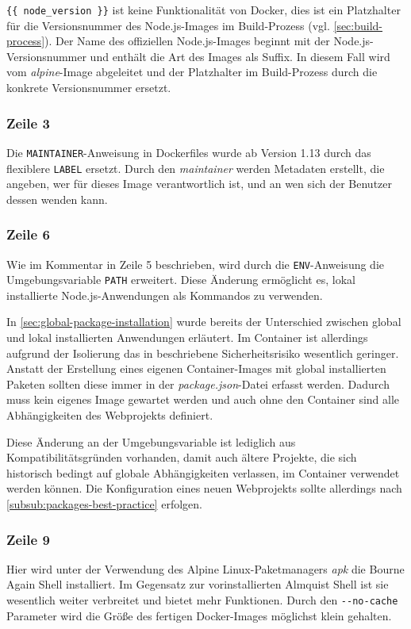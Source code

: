 \verb|{{ node_version }}| ist keine Funktionalität von Docker, dies ist ein Platzhalter für die Versionsnummer des Node.js-Images im Build-Prozess (vgl. \cref{sec:build-process}).
Der Name des offiziellen Node.js-Images beginnt mit der Node.js-Versionsnummer und enthält die Art des Images als Suffix.
In diesem Fall wird vom \emph{alpine}-Image abgeleitet und der Platzhalter im Build-Prozess durch die konkrete Versionsnummer ersetzt.

\subsubsection{Zeile 3}
Die \verb|MAINTAINER|-Anweisung in Dockerfiles wurde ab Version 1.13 durch das flexiblere \verb|LABEL| ersetzt.
Durch den \emph{maintainer} werden Metadaten erstellt, die angeben, wer für dieses Image verantwortlich ist, und an wen sich der Benutzer dessen wenden kann.

\subsubsection{Zeile 6}
Wie im Kommentar in Zeile 5 beschrieben, wird durch die \verb|ENV|-Anweisung die Umgebungsvariable \verb|PATH| erweitert.
Diese Änderung ermöglicht es, lokal installierte Node.js-Anwendungen als Kommandos zu verwenden.

In \cref{sec:global-package-installation} wurde bereits der Unterschied zwischen global und lokal installierten Anwendungen erläutert.
Im Container ist allerdings aufgrund der Isolierung das in \autocite{stackoverflow:nodemodules-hack:online} beschriebene Sicherheitsrisiko wesentlich geringer.
Anstatt der Erstellung eines eigenen Container-Images mit global installierten Paketen sollten diese immer in der \emph{package.json}-Datei erfasst werden.
Dadurch muss kein eigenes Image gewartet werden und auch ohne den Container sind alle Abhängigkeiten des Webprojekts definiert.

Diese Änderung an der Umgebungsvariable ist lediglich aus Kompatibilitätsgründen vorhanden, damit auch ältere Projekte, die sich historisch bedingt auf globale Abhängigkeiten verlassen, im Container verwendet werden können.
Die Konfiguration eines neuen Webprojekts sollte allerdings nach \cref{subsub:packages-best-practice} erfolgen.

\subsubsection{Zeile 9}
Hier wird unter der Verwendung des Alpine Linux-Paketmanagers \emph{apk} die Bourne Again Shell installiert.
Im Gegensatz zur vorinstallierten Almquist Shell ist sie wesentlich weiter verbreitet und bietet mehr Funktionen.
Durch den \verb|--no-cache| Parameter wird die Größe des fertigen Docker-Images möglichst klein gehalten.

